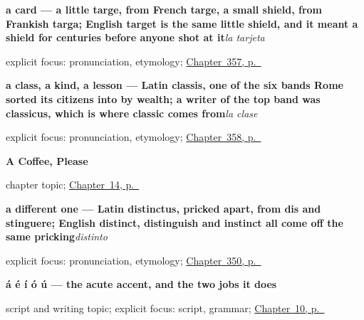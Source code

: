 \noindent\begin{minipage}[t]{\linewidth}
\raggedright
\textbf{a card — a little targe, from French targe, a small shield, from Frankish targa; English target is the same little shield, and it meant a shield for centuries before anyone shot at it}\enspace\emph{la tarjeta}\par
\footnotesize explicit focus: pronunciation, etymology; \hyperref[ch:la-navidad-y-la-pascua]{Chapter~357, p.~\pageref*{ch:la-navidad-y-la-pascua}}
\end{minipage}\par\smallskip

\noindent\begin{minipage}[t]{\linewidth}
\raggedright
\textbf{a class, a kind, a lesson — Latin classis, one of the six bands Rome sorted its citizens into by wealth; a writer of the top band was classicus, which is where classic comes from}\enspace\emph{la clase}\par
\footnotesize explicit focus: pronunciation, etymology; \hyperref[ch:el-color-y-el-tamano]{Chapter~358, p.~\pageref*{ch:el-color-y-el-tamano}}
\end{minipage}\par\smallskip

\noindent\begin{minipage}[t]{\linewidth}
\raggedright
\textbf{A Coffee, Please}\par
\footnotesize chapter topic; \hyperref[ch:a-coffee]{Chapter~14, p.~\pageref*{ch:a-coffee}}
\end{minipage}\par\smallskip

\noindent\begin{minipage}[t]{\linewidth}
\raggedright
\textbf{a different one — Latin distinctus, pricked apart, from dis and stinguere; English distinct, distinguish and instinct all come off the same pricking}\enspace\emph{distinto}\par
\footnotesize explicit focus: pronunciation, etymology; \hyperref[ch:propio-y-ajeno]{Chapter~350, p.~\pageref*{ch:propio-y-ajeno}}
\end{minipage}\par\smallskip

\noindent\begin{minipage}[t]{\linewidth}
\raggedright
\textbf{á é í ó ú — the acute accent, and the two jobs it does}\par
\footnotesize script and writing topic; explicit focus: script, grammar; \hyperref[ch:written-accent]{Chapter~10, p.~\pageref*{ch:written-accent}}
\end{minipage}\par\smallskip

